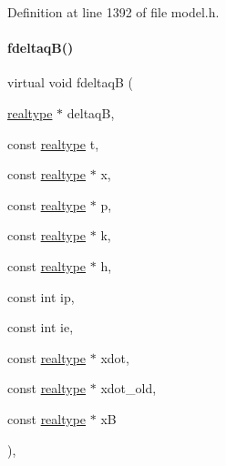 Definition at line 1392 of file model.\+h.

\mbox{\label{classamici_1_1_model_ad2cecb9a4b98d420a4ba6f2aa716bbec}} 
\paragraph{\texorpdfstring{fdeltaq\+B()}{fdeltaqB()}\hspace{0.1cm}{\footnotesize\ttfamily [2/2]}}
{\footnotesize\ttfamily virtual void fdeltaqB (\begin{DoxyParamCaption}\item[{\mbox{\hyperlink{namespaceamici_a1bdce28051d6a53868f7ccbf5f2c14a3}{realtype}} $\ast$}]{deltaqB,  }\item[{const \mbox{\hyperlink{namespaceamici_a1bdce28051d6a53868f7ccbf5f2c14a3}{realtype}}}]{t,  }\item[{const \mbox{\hyperlink{namespaceamici_a1bdce28051d6a53868f7ccbf5f2c14a3}{realtype}} $\ast$}]{x,  }\item[{const \mbox{\hyperlink{namespaceamici_a1bdce28051d6a53868f7ccbf5f2c14a3}{realtype}} $\ast$}]{p,  }\item[{const \mbox{\hyperlink{namespaceamici_a1bdce28051d6a53868f7ccbf5f2c14a3}{realtype}} $\ast$}]{k,  }\item[{const \mbox{\hyperlink{namespaceamici_a1bdce28051d6a53868f7ccbf5f2c14a3}{realtype}} $\ast$}]{h,  }\item[{const int}]{ip,  }\item[{const int}]{ie,  }\item[{const \mbox{\hyperlink{namespaceamici_a1bdce28051d6a53868f7ccbf5f2c14a3}{realtype}} $\ast$}]{xdot,  }\item[{const \mbox{\hyperlink{namespaceamici_a1bdce28051d6a53868f7ccbf5f2c14a3}{realtype}} $\ast$}]{xdot\+\_\+old,  }\item[{const \mbox{\hyperlink{namespaceamici_a1bdce28051d6a53868f7ccbf5f2c14a3}{realtype}} $\ast$}]{xB }\end{DoxyParamCaption})\hspace{0.3cm}{\ttfamily [protected]}, {\ttfamily [virtual]}}

